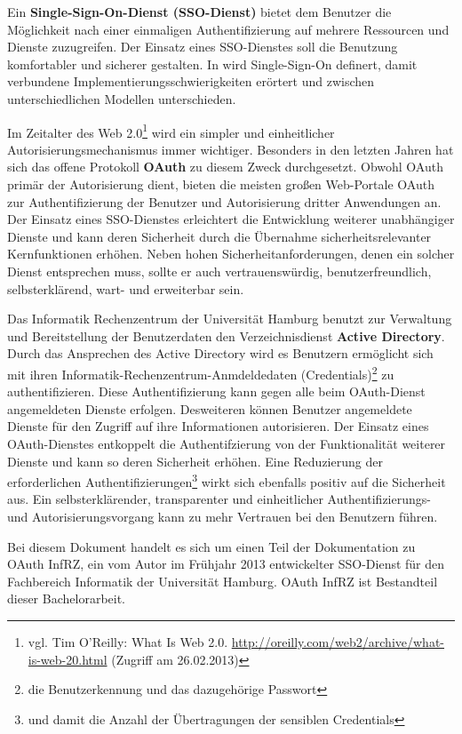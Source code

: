 \documentclass[12pt,a4paper,pointednumbers,abstracton]{scrartcl}
\begin{document}
Ein \textbf{Single-Sign-On-Dienst (SSO-Dienst)} bietet dem Benutzer die Möglichkeit nach einer einmaligen Authentifizierung auf mehrere Ressourcen und Dienste zuzugreifen.
Der Einsatz eines SSO-Dienstes soll die Benutzung komfortabler und sicherer gestalten.
In \cite{Hur97} wird Single-Sign-On definert, damit verbundene Implementierungsschwierigkeiten erörtert und zwischen unterschiedlichen Modellen unterschieden.

Im Zeitalter des Web 2.0\footnote{vgl. Tim O'Reilly: What Is Web 2.0. \url{http://oreilly.com/web2/archive/what-is-web-20.html} (Zugriff am 26.02.2013)} wird ein simpler und einheitlicher Autorisierungsmechanismus immer wichtiger.
Besonders in den letzten Jahren hat sich das offene Protokoll \textbf{OAuth} zu diesem Zweck durchgesetzt.
Obwohl OAuth primär der Autorisierung dient, bieten die meisten großen Web-Portale OAuth zur Authentifizierung der Benutzer und Autorisierung dritter Anwendungen an.
Der Einsatz eines SSO-Dienstes erleichtert die Entwicklung weiterer unabhängiger Dienste und kann deren Sicherheit durch die Übernahme sicherheitsrelevanter Kernfunktionen erhöhen.
Neben hohen Sicherheitanforderungen, denen ein solcher Dienst entsprechen muss, sollte er auch vertrauenswürdig, benutzerfreundlich, selbsterklärend, wart- und erweiterbar sein.

Das Informatik Rechenzentrum der Universität Hamburg benutzt zur Verwaltung und Bereitstellung der Benutzerdaten den Verzeichnisdienst \textbf{Active Directory}.
Durch das Ansprechen des Active Directory wird es Benutzern ermöglicht sich mit ihren Informatik-Rechenzentrum-Anmdeldedaten (Credentials)\footnote{die Benutzerkennung und das dazugehörige Passwort} zu authentifizieren.
Diese Authentifizierung kann gegen alle beim OAuth-Dienst angemeldeten Dienste erfolgen.
Desweiteren können Benutzer angemeldete Dienste für den Zugriff auf ihre Informationen autorisieren.
Der Einsatz eines OAuth-Dienstes entkoppelt die Authentifzierung von der Funktionalität weiterer Dienste und kann so deren Sicherheit erhöhen.
Eine Reduzierung der erforderlichen Authentifizierungen\footnote{und damit die Anzahl der Übertragungen der sensiblen Credentials} wirkt sich ebenfalls positiv auf die Sicherheit aus.
Ein selbsterklärender, transparenter und einheitlicher Authentifizierungs- und Autorisierungsvorgang kann zu mehr Vertrauen bei den Benutzern führen.

Bei diesem Dokument handelt es sich um einen Teil der Dokumentation zu OAuth InfRZ, ein vom Autor im Frühjahr 2013 entwickelter SSO-Dienst für den Fachbereich Informatik der Universität Hamburg.
OAuth InfRZ ist Bestandteil dieser Bachelorarbeit.
\end{document}
